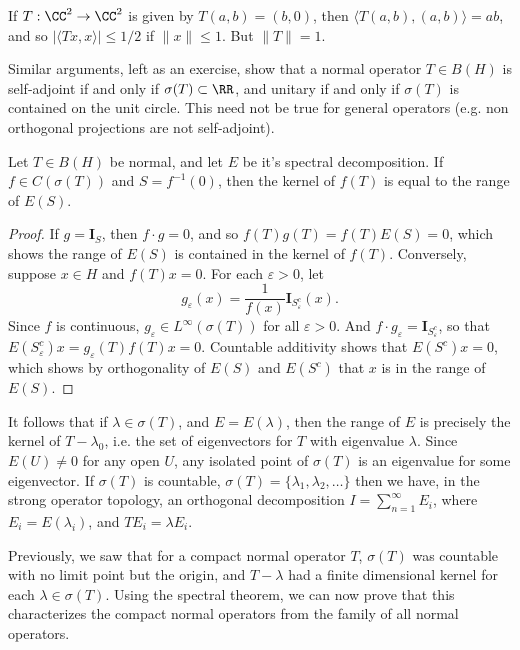 \begin{remark}
    If $T: \CC^2 \to \CC^2$ is given by $T(a,b) = (b,0)$, then $\langle T(a,b), (a,b) \rangle = ab$, and so $|\langle Tx, x \rangle| \leq 1/2$ if $\| x \| \leq 1$. But $\| T \| = 1$.
\end{remark}

Similar arguments, left as an exercise, show that a normal operator $T \in B(H)$ is self-adjoint if and only if $\sigma(T) \subset \RR$, and unitary if and only if $\sigma(T)$ is contained on the unit circle. This need not be true for general operators (e.g. non orthogonal projections are not self-adjoint).

\begin{theorem}
    Let $T \in B(H)$ be normal, and let $E$ be it's spectral decomposition. If $f \in C(\sigma(T))$ and $S = f^{-1}(0)$, then the kernel of $f(T)$ is equal to the range of $E(S)$.
\end{theorem}
\begin{proof}
    If $g = \mathbf{I}_S$, then $f \cdot g = 0$, and so $f(T) g(T) = f(T) E(S) = 0$, which shows the range of $E(S)$ is contained in the kernel of $f(T)$. Conversely, suppose $x \in H$ and $f(T) x = 0$. For each $\varepsilon > 0$, let
    \[ g_\varepsilon(x) = \frac{1}{f(x)} \mathbf{I}_{S_\varepsilon^c}(x). \]
    Since $f$ is continuous, $g_\varepsilon \in L^\infty(\sigma(T))$ for all $\varepsilon > 0$. And $f \cdot g_\varepsilon = \mathbf{I}_{S_\varepsilon^c}$, so that $E(S_\varepsilon^c) x = g_\varepsilon(T) f(T) x = 0$. Countable additivity shows that $E(S^c) x = 0$, which shows by orthogonality of $E(S)$ and $E(S^c)$ that $x$ is in the range of $E(S)$.
\end{proof}

It follows that if $\lambda \in \sigma(T)$, and $E = E(\lambda)$, then the range of $E$ is precisely the kernel of $T - \lambda_0$, i.e. the set of eigenvectors for $T$ with eigenvalue $\lambda$. Since $E(U) \neq 0$ for any open $U$, any isolated point of $\sigma(T)$ is an eigenvalue for some eigenvector. If $\sigma(T)$ is countable, $\sigma(T) = \{ \lambda_1, \lambda_2, \dots \}$ then we have, in the strong operator topology, an orthogonal decomposition $I = \sum_{n = 1}^\infty E_i$, where $E_i = E(\lambda_i)$, and $TE_i = \lambda E_i$.

Previously, we saw that for a compact normal operator $T$, $\sigma(T)$ was countable with no limit point but the origin, and $T - \lambda$ had a finite dimensional kernel for each $\lambda \in \sigma(T)$. Using the spectral theorem, we can now prove that this characterizes the compact normal operators from the family of all normal operators.

